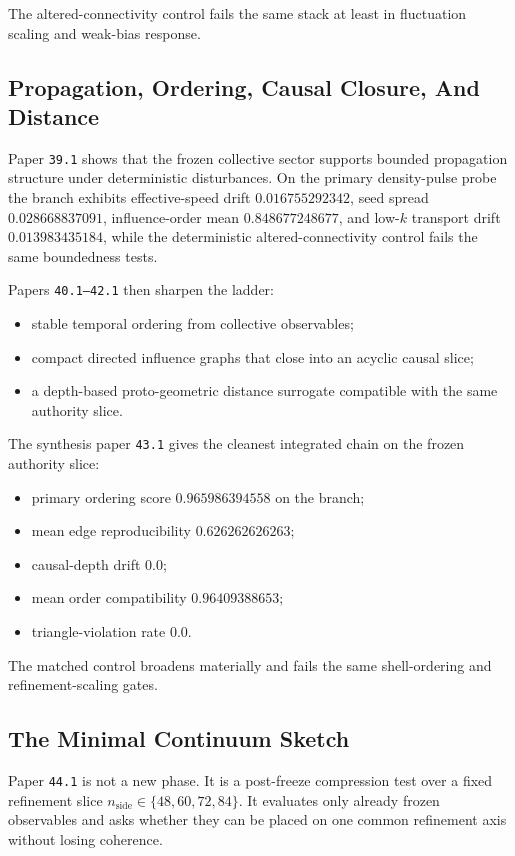 \documentclass[11pt]{article}
\begin{document}
The altered-connectivity control fails the same stack at least in fluctuation scaling and weak-bias response.

\subsection{Propagation, Ordering, Causal Closure, And Distance}

Paper \texttt{39.1} shows that the frozen collective sector supports bounded propagation structure under deterministic disturbances. On the primary density-pulse probe the branch exhibits effective-speed drift $0.016755292342$, seed spread $0.028668837091$, influence-order mean $0.848677248677$, and low-$k$ transport drift $0.013983435184$, while the deterministic altered-connectivity control fails the same boundedness tests.

Papers \texttt{40.1--42.1} then sharpen the ladder:
\begin{itemize}
\item stable temporal ordering from collective observables;
\item compact directed influence graphs that close into an acyclic causal slice;
\item a depth-based proto-geometric distance surrogate compatible with the same authority slice.
\end{itemize}

The synthesis paper \texttt{43.1} gives the cleanest integrated chain on the frozen authority slice:
\begin{itemize}
\item primary ordering score $0.965986394558$ on the branch;
\item mean edge reproducibility $0.626262626263$;
\item causal-depth drift $0.0$;
\item mean order compatibility $0.96409388653$;
\item triangle-violation rate $0.0$.
\end{itemize}

The matched control broadens materially and fails the same shell-ordering and refinement-scaling gates.

\subsection{The Minimal Continuum Sketch}

Paper \texttt{44.1} is not a new phase. It is a post-freeze compression test over a fixed refinement slice $n_{\mathrm{side}} \in \{48,60,72,84\}$. It evaluates only already frozen observables and asks whether they can be placed on one common refinement axis without losing coherence.
\end{document}
